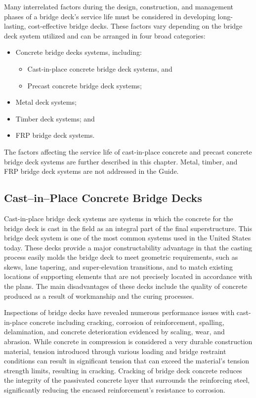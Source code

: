 Many interrelated factors during the design, construction, and management phases of a bridge deck’s service life must be considered in developing long-lasting, cost-effective bridge decks. These factors vary depending on the bridge deck system utilized and can be arranged in four broad categories:
\begin{itemize}
  \item Concrete bridge decks systems, including:
  \begin{itemize}
    \item Cast-in-place concrete bridge deck systems, and
    \item Precast concrete bridge deck systems;
  \end{itemize}
  \item Metal deck systems;
  \item Timber deck systems; and
  \item FRP bridge deck systems.
\end{itemize}

The factors affecting the service life of cast-in-place concrete and precast concrete bridge deck systems are further described in this chapter. Metal, timber, and FRP bridge deck systems are not addressed in the Guide.

\subsection{Cast–in–Place Concrete Bridge Decks}
Cast-in-place bridge deck systems are systems in which the concrete for the bridge deck is cast in the field as an integral part of the final superstructure. This bridge deck system is one of the most common systems used in the United States today. These decks provide a major constructability advantage in that the casting process easily molds the bridge deck to meet geometric requirements, such as skews, lane tapering, and super-elevation transitions, and to match existing locations of supporting elements that are not precisely located in accordance with the plans. The main disadvantages of these decks include the quality of concrete produced as a result of workmanship and the curing processes.

Inspections of bridge decks have revealed numerous performance issues with cast-in-place concrete including cracking, corrosion of reinforcement, spalling, delamination, and concrete deterioration evidenced by scaling, wear, and abrasion. While concrete in compression is considered a very durable construction material, tension introduced through various loading and bridge restraint conditions can result in significant tension that can exceed the material's tension strength limits, resulting in cracking. Cracking of bridge deck concrete reduces the integrity of the passivated concrete layer that surrounds the reinforcing steel, significantly reducing the encased reinforcement’s resistance to corrosion.

